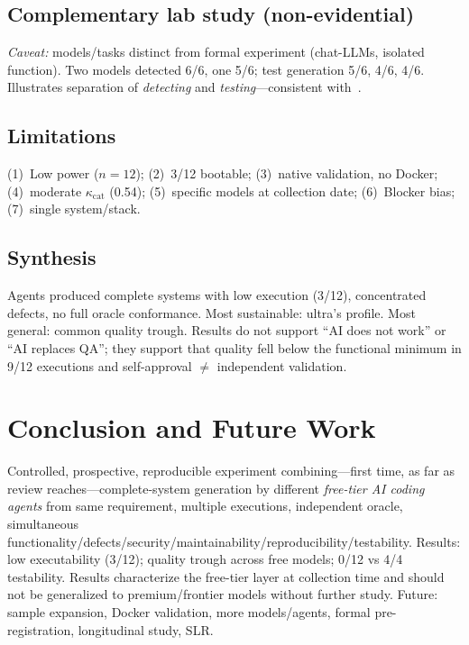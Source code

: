 \documentclass[10pt,twocolumn]{article}
\begin{document}
\subsection{Complementary lab study (non-evidential)}

\emph{Caveat:} models/tasks distinct from formal experiment (chat-LLMs, isolated function). Two models detected 6/6, one 5/6; test generation 5/6, 4/6, 4/6. Illustrates separation of \emph{detecting} and \emph{testing}---consistent with~\cite{C03,C04}.

\subsection{Limitations}\label{sec:limitations}

(1)~Low power ($n=12$); (2)~3/12 bootable; (3)~native validation, no Docker; (4)~moderate $\kappa_{\text{cat}}$ (0.54); (5)~specific models at collection date; (6)~Blocker bias; (7)~single system/stack.

\subsection{Synthesis}

Agents produced complete systems with low execution (3/12), concentrated defects, no full oracle conformance. Most sustainable: ultra's profile. Most general: common quality trough. Results do not support ``AI does not work'' or ``AI replaces QA''; they support that quality fell below the functional minimum in 9/12 executions and self-approval $\neq$ independent validation.

\section{Conclusion and Future Work}

Controlled, prospective, reproducible experiment combining---first time, as far as review reaches---complete-system generation by different \emph{free-tier AI coding agents} from same requirement, multiple executions, independent oracle, simultaneous functionality/defects/security/maintainability/reproducibility/testability. Results: low executability (3/12); quality trough across free models; 0/12 vs 4/4 testability. Results characterize the free-tier layer at collection time and should not be generalized to premium/frontier models without further study. Future: sample expansion, Docker validation, more models/agents, formal pre-registration, longitudinal study, SLR.
\end{document}

